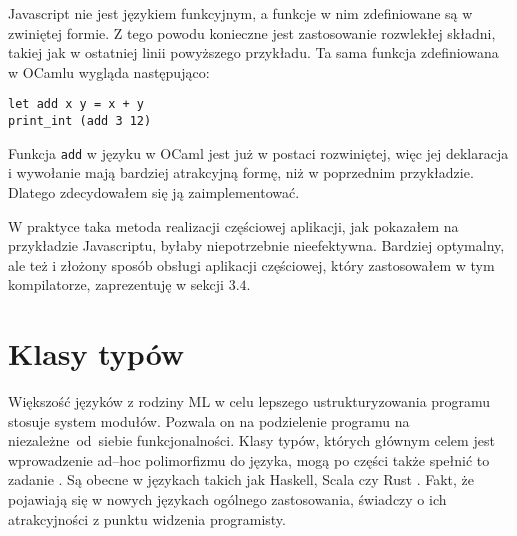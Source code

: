 \documentclass[declaration,shortabstract]{iithesis}
\begin{document}
Javascript nie jest językiem funkcyjnym, a funkcje w nim zdefiniowane są w 
zwiniętej formie. Z tego powodu konieczne jest zastosowanie rozwlekłej składni,
takiej jak w ostatniej linii powyższego przykładu. Ta sama funkcja 
zdefiniowana w OCamlu wygląda następująco:

\begin{lstlisting}[frame=lines]
let add x y = x + y 
print_int (add 3 12)
\end{lstlisting}

Funkcja \texttt{add} w języku w OCaml jest już w postaci rozwiniętej, więc jej 
deklaracja i wywołanie mają bardziej atrakcyjną formę, niż w poprzednim 
przykładzie. Dlatego zdecydowałem się ją zaimplementować.

W praktyce taka metoda realizacji częściowej aplikacji, jak pokazałem na 
przykładzie Javascriptu, byłaby niepotrzebnie nieefektywna. Bardziej optymalny,
ale też i złożony sposób obsługi aplikacji częściowej, który zastosowałem w tym 
kompilatorze, zaprezentuję w sekcji $3.4$.




\section{Klasy typów}
Większość języków z rodziny ML w celu lepszego ustrukturyzowania
programu stosuje system modułów. Pozwala on na podzielenie programu na 
niezależne~od~siebie funkcjonalności.
Klasy typów, których głównym celem jest wprowadzenie 
ad--hoc polimorfizmu do języka, mogą po części także spełnić to zadanie 
\cite{modules_vs_typeclasses}. 
Są obecne w językach takich jak Haskell, Scala\cite{scala_traits} czy Rust
\cite{rust_traits}. Fakt, że pojawiają się
w nowych językach ogólnego zastosowania, świadczy o ich atrakcyjności z punktu 
widzenia programisty. 
\end{document}
